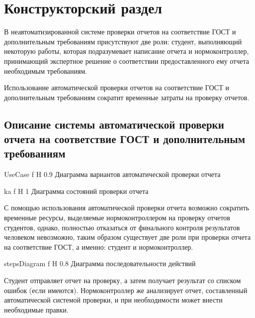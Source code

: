 \chapter{Конструкторский раздел}
В неавтоматизированной системе проверки отчетов на соответствие ГОСТ и дополнительным требованиям присутствуют две роли: студент, выполняющий некоторую работы, которая подразумевает написание отчета и нормоконтроллер, принимающий экспертное решение о соответствии предоставленного ему отчета необходимым требованиям.

Использование автоматической проверки отчетов на соответствие ГОСТ и дополнительным требованиям сократит временные затраты на проверку отчетов.

\section{Описание системы автоматической проверки отчета на соответствие ГОСТ и дополнительным требованиям}

{UseCase} %
{f} %
{H} %
{0.9\textwidth} %
{Диаграмма вариантов автоматической проверки отчета} %

{ka} %
{f} %
{H} %
{1\textwidth} %
{Диаграмма состояний проверки отчета} %

С помощью использования автоматической проверки отчета возможно сократить временные ресурсы, выделяемые нормоконтроллером на проверку отчетов студентов, однако, полностью отказаться от финального контроля результатов человеком невозможно, таким образом существует две роли при проверки отчета на соответствие ГОСТ, а именно: студент и нормоконтроллер.

{stepsDiagram} %
{f} %
{H} %
{0.8\textwidth} %
{Диаграмма последовательности действий} %

Студент отправляет отчет на проверку, а затем получает результат со списком ошибок (если имеются). Нормоконтроллер же анализирует отчет, составленный автоматической системой проверки, и при необходимости может внести необходимые правки.

